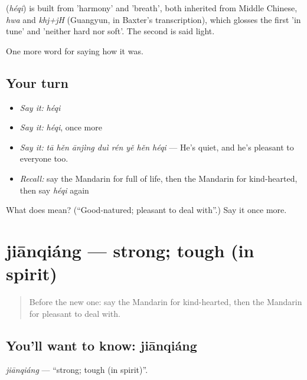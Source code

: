 \begin{cousinweb}
\textbf{} (\emph{héqi}) is built from  'harmony' and  'breath', both inherited from Middle Chinese, \emph{hwa} and \emph{khj+jH} (Guangyun, in Baxter's transcription), which glosses the first 'in tune' and 'neither hard nor soft'. The second is said light.
\end{cousinweb}

\begin{grammarlens}[title={What you've built}]
One more word for saying how it was.
\end{grammarlens}

\subsection*{Your turn}
\begin{itemize}
\raggedright
  \item \emph{Say it:} \emph{héqi}
  \item \emph{Say it:} \emph{héqi}, once more
  \item \emph{Say it:} \emph{tā hěn ānjìng duì rén yě hěn héqi} — He's quiet, and he's pleasant to everyone too.
  \item \emph{Recall:} say the Mandarin for full of life, then the Mandarin for kind-hearted, then say \emph{héqi} again
\end{itemize}

\begin{tcolorbox}[breakable,colback=teal!4,colframe=teal!35!black,title={Before you move on}]
What does  mean? (\textquotedblleft{}Good-natured; pleasant to deal with\textquotedblright{}.) Say it once more.
\end{tcolorbox}
\section[jiānqiáng]{jiānqiáng — strong; tough (in spirit)}

\label{lesson:ZH-C468-jianqiang}



\begin{quote}
Before the new one: say the Mandarin for kind-hearted, then the Mandarin for pleasant to deal with.
\end{quote}

\subsection*{You'll want to know: jiānqiáng}
\emph{jiānqiáng} — \textquotedblleft{}strong; tough (in spirit)\textquotedblright{}.

